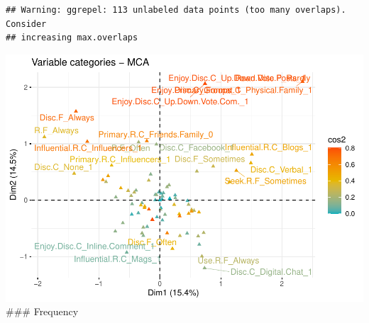 \documentclass[
]{article}
\newenvironment{Shaded}{\begin{snugshade}}{\end{snugshade}}
\newcommand{\DataTypeTok}[1]{\textcolor[rgb]{0.13,0.29,0.53}{#1}}
\newcommand{\KeywordTok}[1]{\textcolor[rgb]{0.13,0.29,0.53}{\textbf{#1}}}
\newcommand{\NormalTok}[1]{#1}
\newcommand{\OtherTok}[1]{\textcolor[rgb]{0.56,0.35,0.01}{#1}}
\newcommand{\StringTok}[1]{\textcolor[rgb]{0.31,0.60,0.02}{#1}}
\begin{document}
\begin{Shaded}
\end{Shaded}

\begin{verbatim}
## Warning: ggrepel: 113 unlabeled data points (too many overlaps). Consider
## increasing max.overlaps
\end{verbatim}

\includegraphics{Average-User-MCA_files/figure-latex/diet no social-3.pdf}
\#\#\# Frequency
\end{document}
